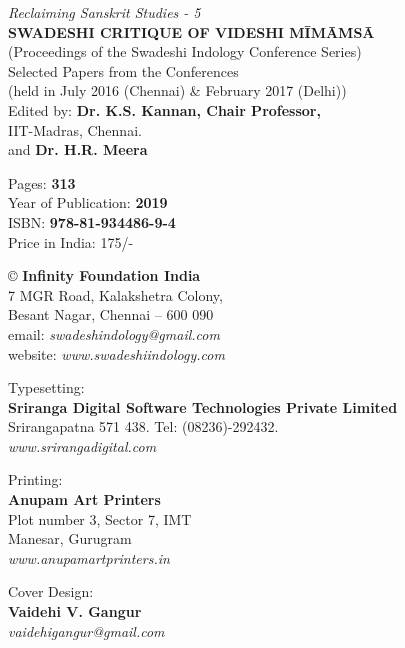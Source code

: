 \thispagestyle{empty}

\textit{Reclaiming Sanskrit Studies - 5}\\ \textbf{SWADESHI CRITIQUE OF VIDESHI MĪMĀṀSĀ}\\ (Proceedings of the Swadeshi Indology Conference Series)\\ Selected Papers from the Conferences\\ (held in July 2016 (Chennai) \& February 2017 (Delhi))\\ Edited by: \textbf{Dr. K.S. Kannan, Chair Professor,}\\ IIT-Madras, Chennai.\\ and \textbf{Dr. H.R. Meera}

Pages: \textbf{313}\\ Year of Publication: \textbf{2019}\\ ISBN: \textbf{978-81-934486-9-4}\\ Price in India: 175/-

© \textbf{Infinity Foundation India}\\ 7 MGR Road, Kalakshetra Colony,\\ Besant Nagar, Chennai -- 600 090\\ email: \textit{swadeshindology@gmail.com}\\ website: \textit{www.swadeshiindology.com}

Typesetting:\\ \textbf{Sriranga Digital Software Technologies Private Limited}\\ Srirangapatna 571 438. Tel: (08236)-292432.\\ \textit{www.srirangadigital.com}

Printing:\\ \textbf{Anupam Art Printers}\\ Plot number 3, Sector 7, IMT\\ Manesar, Gurugram\\ \textit{www.anupamartprinters.in}

Cover Design:\\ \textbf{Vaidehi V. Gangur}\\ \textit{vaidehigangur@gmail.com}

